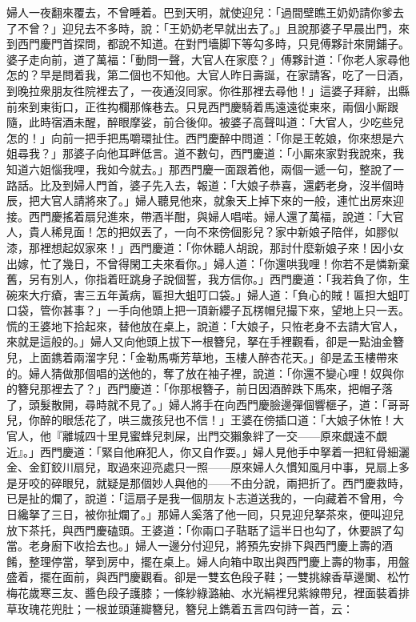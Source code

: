 婦人一夜翻來覆去，不曾睡着。巴到天明，就使迎兒：「過間壁瞧王奶奶請你爹去了不曾？」迎兒去不多時，說：「王奶奶老早就出去了。」且說那婆子早晨出門，來到西門慶門首探問，都說不知道。在對門墻脚下等勾多時，只見傅夥計來開鋪子。婆子走向前，道了萬福：「動問一聲，大官人在家麼？」傅夥計道：「你老人家尋他怎的？早是問着我，第二個也不知他。大官人昨日壽誕，在家請客，吃了一日酒，到晚拉衆朋友徃院裡去了，一夜通沒囘家。你徃那裡去尋他！」這婆子拜辭，出縣前來到東街口，正徃抅欄那條巷去。只見西門慶騎着馬遠遠從東來，兩個小厮跟隨，此時宿酒未醒，醉眼摩娑，前合後仰。被婆子高聲叫道：「大官人，少吃些兒怎的！」向前一把手把馬嚼環扯住。西門慶醉中問道：「你是王乾娘，你來想是六姐尋我？」那婆子向他耳畔低言。道不數句，西門慶道：「小厮來家對我說來，我知道六姐惱我哩，我如今就去。」那西門慶一面跟着他，兩個一遞一句，整說了一路話。比及到婦人門首，婆子先入去，報道：「大娘子恭喜，還虧老身，沒半個時辰，把大官人請將來了。」婦人聽見他來，就象天上掉下來的一般，連忙出房來迎接。西門慶搖着扇兒進來，帶酒半酣，與婦人唱喏。婦人還了萬福，說道：「大官人，貴人稀見面！怎的把奴丟了，一向不來傍個影兒？家中新娘子陪伴，如膠似漆，那裡想起奴家來！」西門慶道：「你休聽人胡說，那討什麼新娘子來！因小女出嫁，忙了幾日，不曾得閑工夫來看你。」婦人道：「你還哄我哩！你若不是憐新棄舊，另有別人，你指着旺跳身子說個誓，我方信你。」西門慶道：「我若負了你，生碗來大疔瘡，害三五年黃病，匾担大蛆叮口袋。」婦人道：「負心的賊！匾担大蛆叮口袋，管你甚事？」一手向他頭上把一頂新纓子瓦楞帽兒撮下來，望地上只一丟。慌的王婆地下拾起來，替他放在桌上，說道：「大娘子，只恠老身不去請大官人，來就是這般的。」婦人又向他頭上拔下一根簪兒，拏在手裡觀看，卻是一點油金簪兒，上面鎸着兩溜字兒：「金勒馬嘶芳草地，玉樓人醉杏花天。」{}卻是孟玉樓帶來的。婦人猜做那個唱的送他的，奪了放在袖子裡，說道：「你還不變心哩！奴與你的簪兒那裡去了？」西門慶道：「你那根簪子，前日因酒醉跌下馬來，把帽子落了，頭髮散開，尋時就不見了。」婦人將手在向西門慶臉邊彈個響榧子，道：「哥哥兒，你醉的眼恁花了，哄三歲孩兒也不信！」王婆在傍插口道：「大娘子休恠！大官人，他『離城四十里見蜜蜂兒刺屎，出門交獺象絆了一交——原來覷遠不覷近』。」{}西門慶道：「緊自他麻犯人，你又自作耍。」婦人見他手中拏着一把紅骨細灑金、金釘鉸川扇兒，取過來迎亮處只一照——原來婦人久慣知風月中事，見扇上多是牙咬的碎眼兒，就疑是那個妙人與他的——不由分說，兩把折了。西門慶救時，已是扯的爛了，說道：「這扇子是我一個朋友卜志道送我的，{}一向藏着不曾用，今日纔拏了三日，被你扯爛了。」那婦人奚落了他一囘，只見迎兒拏茶來，便叫迎兒放下茶托，與西門慶磕頭。王婆道：「你兩口子聐聒了這半日也勾了，休要誤了勾當。老身廚下收拾去也。」婦人一邊分付迎兒，將預先安排下與西門慶上壽的酒餚，整理停當，拏到房中，擺在桌上。婦人向箱中取出與西門慶上壽的物事，用盤盛着，擺在面前，與西門慶觀看。卻是一雙玄色段子鞋；一雙挑線香草邊闌、松竹梅花歲寒三友、醬色段子護膝；一條紗綠潞紬、水光絹裡兒紫線帶兒，裡面裝着排草玫瑰花兜肚；一根並頭蓮瓣簪兒，簪兒上鐫着五言四句詩一首，云：

